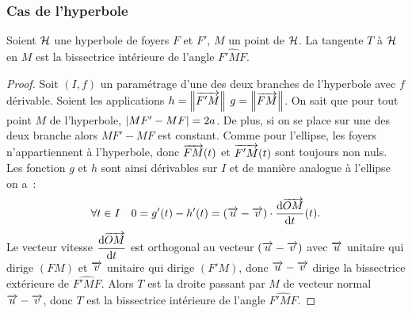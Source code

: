 \subsubsection{Cas de l'hyperbole}
\begin{prop}
  Soient $\mathcal{H}$ une hyperbole de foyers $F$ et $F'$, $M$ un point de $\mathcal{H}$. La tangente $T$ à $\mathcal{H}$ en $M$ est la bissectrice intérieure de l'angle $\widehat{F'MF}$.
\end{prop}
\begin{proof}
  Soit $(I,f)$ un paramétrage d'une des deux branches de l'hyperbole avec $f$ dérivable. Soient les applications $h=\left\lVert\overrightarrow{F'M}\right\rVert$ $g=\left\lVert\overrightarrow{FM}\right\rVert$. On sait que pour tout point $M$ de l'hyperbole, $\left\lvert MF'-MF\right\rvert=2a$. De plus, si on se place sur une des deux branche alors $MF'-MF$ est constant. Comme pour l'ellipse, les foyers n'appartiennent à l'hyperbole, donc $\overrightarrow{FM}(t)$ et $\overrightarrow{F'M}(t)$ sont toujours non nuls. Les fonction $g$ et $h$ sont ainsi dérivables sur $I$ et de manière analogue à l'ellipse on a~:
\begin{equation}
\forall t \in I \quad 0=g'(t)-h'(t)=(\overrightarrow{u}-\overrightarrow{v})\cdot \dfrac{\mathrm{d} \overrightarrow{OM}}{\mathrm{d} t}(t).
\end{equation}
 Le vecteur vitesse $\dfrac{\mathrm{d} \overrightarrow{OM}}{\mathrm{d} t}$ est orthogonal au vecteur $(\overrightarrow{u}-\overrightarrow{v})$ avec $\overrightarrow{u}$ unitaire qui dirige $(FM)$ et $\overrightarrow{v}$ unitaire qui dirige $(F'M)$, donc $\overrightarrow{u}-\overrightarrow{v}$ dirige la bissectrice extérieure de $\widehat{F'MF}$. Alors $T$ est la droite passant par $M$ de vecteur normal $\overrightarrow{u}-\overrightarrow{v}$, donc $T$ est la bissectrice intérieure de l'angle $\widehat{F'MF}$.
\end{proof}